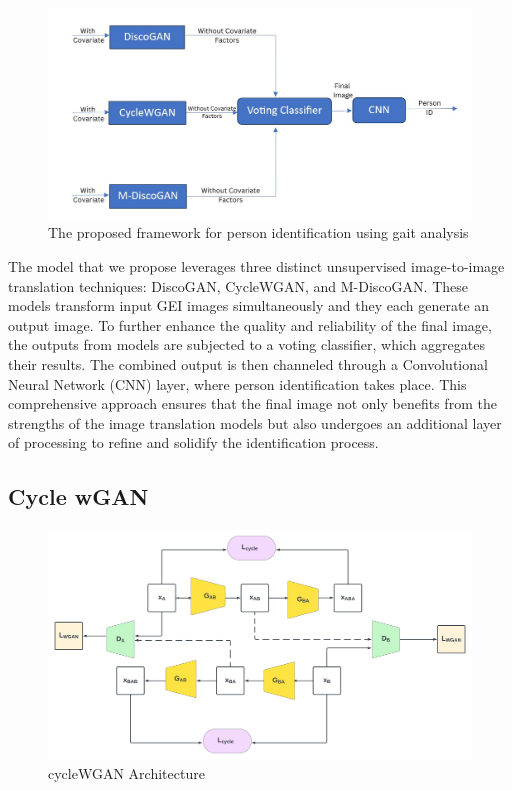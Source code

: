 \documentclass[12pt,a4paper]{article}
\begin{document}
\begin{figure}[!h]
  \centering
\includegraphics[scale=0.5]{images/overall.jpg}
  \caption{The proposed framework for person identification using gait analysis}
  \label{fig:Overall}
\end{figure}

The model that we propose leverages three distinct unsupervised image-to-image translation techniques: DiscoGAN, CycleWGAN, and M-DiscoGAN. These models transform input GEI images simultaneously and they each generate an output image. To further enhance the quality and reliability of the final image, the outputs from models are subjected to a voting classifier, which aggregates their results. The combined output is then channeled through a Convolutional Neural Network (CNN) layer, where person identification takes place. This comprehensive approach ensures that the final image not only benefits from the strengths of the image translation models but also undergoes an additional layer of processing to refine and solidify the identification process.

\clearpage
\subsection{Cycle wGAN}
\begin{figure}[!h]
  \centering
\includegraphics[scale = 0.4]{images/color_cw.png}
  \caption{cycleWGAN Architecture}
  \label{fig:cycleWGAN}
\end{figure}
\end{document}
